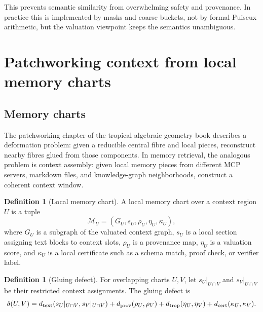 \documentclass[11pt]{article}
\theoremstyle{definition}
\newtheorem{definition}[theorem]{Definition}
\theoremstyle{remark}
\begin{document}
This prevents semantic similarity from overwhelming safety and provenance. In practice this is implemented by masks and coarse buckets, not by formal Puiseux arithmetic, but the valuation viewpoint keeps the semantics unambiguous.

\section{Patchworking context from local memory charts}

\subsection{Memory charts}

The patchworking chapter of the tropical algebraic geometry book describes a deformation problem: given a reducible central fibre and local pieces, reconstruct nearby fibres glued from those components. In memory retrieval, the analogous problem is context assembly: given local memory pieces from different MCP servers, markdown files, and knowledge-graph neighborhoods, construct a coherent context window.

\begin{definition}[Local memory chart]
A local memory chart over a context region \(U\) is a tuple
\[
    \mathcal M_U=(G_U,s_U,\rho_U,\eta_U,\kappa_U),
\]
where \(G_U\) is a subgraph of the valuated context graph, \(s_U\) is a local section assigning text blocks to context slots, \(\rho_U\) is a provenance map, \(\eta_U\) is a valuation score, and \(\kappa_U\) is a local certificate such as a schema match, proof check, or verifier label.
\end{definition}

\begin{definition}[Gluing defect]
For overlapping charts \(U,V\), let \(s_U|_{U\cap V}\) and \(s_V|_{U\cap V}\) be their restricted context assignments. The gluing defect is
\[
    \delta(U,V)=d_{\rm text}(s_U|_{U\cap V},s_V|_{U\cap V})+d_{\rm prov}(\rho_U,\rho_V)+d_{\rm trop}(\eta_U,\eta_V)+d_{\rm cert}(\kappa_U,\kappa_V).
\]
\end{definition}
\end{document}
